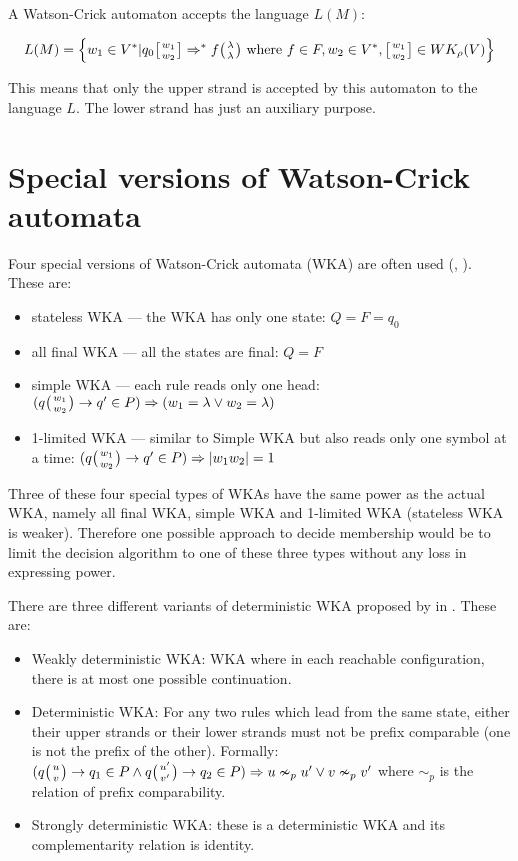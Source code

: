A Watson-Crick automaton accepts the language $L(M)$:

$$L(M) = \Big\{w_1 \in V^* | q_0 \wkdomain{w_1}{w_2} \Rightarrow^* f \wkpair{\lambda}{\lambda} \textnormal{ where } f \in F, w_2 \in V^*, \wkdomain{w_1}{w_2} \in WK_{\rho}(V)\Big\}$$

This means that only the upper strand is accepted by this automaton to the language $L$. The lower strand has just an auxiliary purpose.

\section{Special versions of Watson-Crick automata}
Four special versions of Watson-Crick automata (WKA) are often used (\cite{DETERM_WKA}, \cite{STATE_COMPL}). These are:
\begin{itemize}
  \item{stateless WKA --- the WKA has only one state: $Q = F = {q_0}$}
  \item{all final WKA --- all the states are final: $Q = F$}
  \item{simple WKA --- each rule reads only one head: $(q \wkpair{w_1}{w_2} \rightarrow q' \in P) \Rightarrow (w_1 = \lambda \vee w_2 = \lambda)$}
  \item{1-limited WKA --- similar to Simple WKA but also reads only one symbol at a time: $(q\wkpair{w_1}{w_2} \rightarrow q' \in P) \Rightarrow |w_1 w_2| = 1$}
\end{itemize}

Three of these four special types of WKAs have the same power as the actual WKA, namely all final WKA, simple WKA and 1-limited WKA (stateless WKA is weaker). Therefore one possible approach to decide membership would be to limit the decision algorithm to one of these three types without any loss in expressing power.

There are three different variants of deterministic WKA proposed by in \cite{DETERM_WKA}. These are:
\begin{itemize}
  \item{Weakly deterministic WKA: WKA where in each reachable configuration, there is at most one possible continuation.}
  \item{Deterministic WKA: For any two rules which lead from the same state, either their upper strands or their lower strands must not be prefix comparable (one is not the prefix of the other). Formally: $(q \wkpair{u}{v} \rightarrow q_1 \in P \wedge q \wkpair{u'}{v'} \rightarrow q_2 \in P) \Rightarrow u \nsim_p u' \vee v \nsim_p v'$ where $\sim_p$ is the relation of prefix comparability.}
  \item{Strongly deterministic WKA: these is a deterministic WKA and its complementarity relation is identity.}
\end{itemize}

